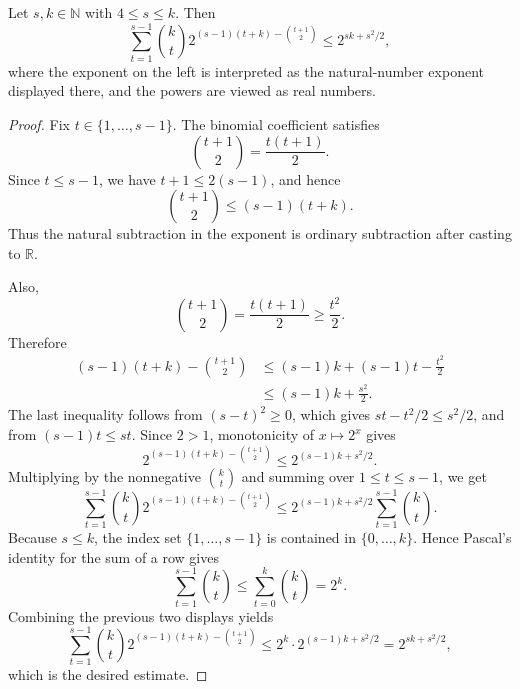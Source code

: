 \begin{helper}
Let \(s,k\in\mathbb N\) with \(4\le s\le k\). Then
\[
  \sum_{t=1}^{s-1}\binom{k}{t}
    2^{(s-1)(t+k)-\binom{t+1}{2}}
  \le
  2^{sk+s^2/2},
\]
where the exponent on the left is interpreted as the natural-number exponent
displayed there, and the powers are viewed as real numbers.
\end{helper}
\begin{proof}
Fix \(t\in\{1,\ldots,s-1\}\). The binomial coefficient satisfies
\[
  \binom{t+1}{2}=\frac{t(t+1)}2.
\]
Since \(t\le s-1\), we have \(t+1\le 2(s-1)\), and hence
\[
  \binom{t+1}{2}\le (s-1)(t+k).
\]
Thus the natural subtraction in the exponent is ordinary subtraction after
casting to \(\mathbb R\).

Also,
\[
  \binom{t+1}{2}=\frac{t(t+1)}2\ge \frac{t^2}{2}.
\]
Therefore
\[
\begin{aligned}
  (s-1)(t+k)-\binom{t+1}{2}
  &\le (s-1)k+(s-1)t-\frac{t^2}{2} \\
  &\le (s-1)k+\frac{s^2}{2}.
\end{aligned}
\]
The last inequality follows from
\((s-t)^2\ge0\), which gives \(st-t^2/2\le s^2/2\), and from
\((s-1)t\le st\). Since \(2>1\), monotonicity of \(x\mapsto 2^x\) gives
\[
  2^{(s-1)(t+k)-\binom{t+1}{2}}
  \le 2^{(s-1)k+s^2/2}.
\]
Multiplying by the nonnegative \(\binom{k}{t}\) and summing over
\(1\le t\le s-1\), we get
\[
  \sum_{t=1}^{s-1}\binom{k}{t}
    2^{(s-1)(t+k)-\binom{t+1}{2}}
  \le
  2^{(s-1)k+s^2/2}
  \sum_{t=1}^{s-1}\binom{k}{t}.
\]
Because \(s\le k\), the index set \(\{1,\ldots,s-1\}\) is contained in
\(\{0,\ldots,k\}\). Hence Pascal's identity for the sum of a row gives
\[
  \sum_{t=1}^{s-1}\binom{k}{t}
  \le
  \sum_{t=0}^{k}\binom{k}{t}
  =
  2^k.
\]
Combining the previous two displays yields
\[
  \sum_{t=1}^{s-1}\binom{k}{t}
    2^{(s-1)(t+k)-\binom{t+1}{2}}
  \le
  2^k\cdot 2^{(s-1)k+s^2/2}
  =
  2^{sk+s^2/2},
\]
which is the desired estimate.
\end{proof}
